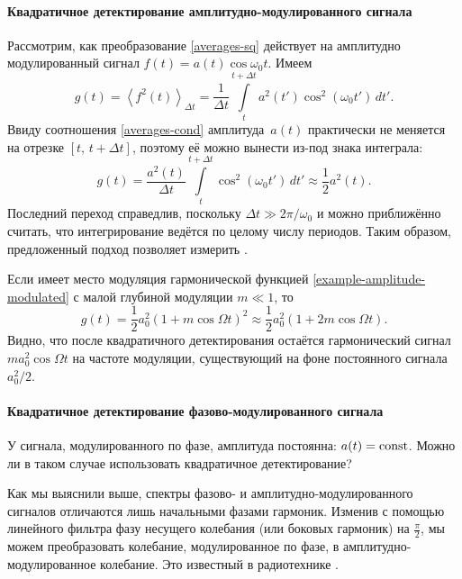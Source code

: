 \paragraph{Квадратичное детектирование амплитудно-модулированного сигнала}
Рассмотрим, как преобразование \eqref{averages-sq} действует на
амплитудно модулированный сигнал $f(t) = a(t) \cos \omega_0 t$. Имеем
\begin{equation*}
 g(t) = \left<f^2(t)\right>_{\Delta t} =
 \frac{1}{\Delta t}
\int\limits_{t}^{t+\Delta t} a^2 (t') \cos^2(\omega_0 t')\,dt'.
\end{equation*}
Ввиду соотношения \eqref{averages-cond} амплитуда~$a(t)$ практически не меняется
на отрезке $[t,\,t+\Delta t]$, поэтому её можно вынести из-под знака интеграла:
\begin{equation}
 g(t)= \frac{a^2(t)}{\Delta t} \int\limits_{t}^{t+\Delta t} \cos^2(\omega_0 t')\,dt'\approx
 \frac12 a^2(t).
\end{equation}
Последний переход справедлив, поскольку $\Delta t \gg 2\pi/\omega_0$ и
можно приближённо считать, что интегрирование ведётся по целому числу периодов.
Таким образом, предложенный подход позволяет измерить 
.

Если имеет место модуляция гармонической функцией
\eqref{example-amplitude-modulated}
с малой глубиной модуляции $m\ll 1$, то
\begin{equation*}
 g(t) = \frac12 a_0^2 (1+m\cos\Omega t)^2 \approx
 \frac12 a_0^2 (1+2m\cos\Omega t).
\end{equation*}
Видно, что после квадратичного детектирования остаётся гармонический
сигнал $m a_0^2 \cos\Omega t$ на частоте модуляции, существующий на фоне
постоянного сигнала $a_0^2/2$.

\paragraph{Квадратичное детектирование фазово-модулированного сигнала}
У сигнала, модулированного по фазе, амплитуда постоянна: $a(t)=\mathrm{const}$.
Можно ли в таком случае использовать квадратичное детектирование?

Как мы выяснили выше, спектры фазово- и амплитудно-модулированного сигналов
отличаются лишь начальными фазами гармоник. Изменив с помощью линейного фильтра
фазу несущего колебания (или боковых гармоник) на $\frac{\pi}{2}$,
мы можем преобразовать колебание, модулированное по фазе,
в амплитудно-модулированное колебание. Это известный в
радиотехнике .

